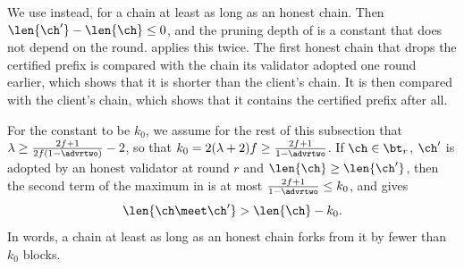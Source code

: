 We use  instead, for a chain at least as long as an honest
chain. Then $\len{\ch'}-\len{\ch}\le0$, and the pruning depth of
 is a constant that does not depend on the round.
 applies this twice. The first honest chain that drops the
certified prefix is compared with the chain its validator adopted one round
earlier, which shows that it is shorter than the client's chain. It is then
compared with the client's chain, which shows that it contains the certified
prefix after all.

For the constant to be $k_0$, we assume for the rest of this subsection that
$\lambda\ge\frac{2f+1}{2f(1-\advrtwo)}-2$, so that
$k_0=2(\lambda+2)f\ge\frac{2f+1}{1-\advrtwo}$. If $\ch\in\bt_r$, $\ch'$ is
adopted by an honest validator at round $r$ and $\len{\ch}\ge\len{\ch'}$, then
the second term of the maximum in  is at most
$\frac{2f+1}{1-\advrtwo}\le k_0$, and  gives
\begin{equation}\label{eq.longer}
    \len{\ch\meet\ch'} > \len{\ch}-k_0 .
\end{equation}
In words, a chain at least as long as an honest chain forks from it by fewer
than $k_0$ blocks.

